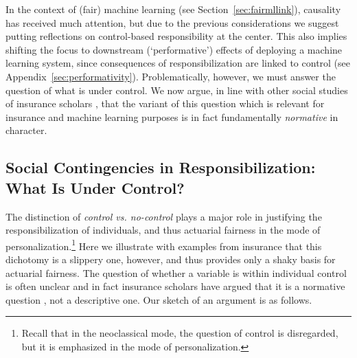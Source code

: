 \documentclass[11pt]{article} %
\begin{document}
In the context of (fair) machine learning (see Section~\ref{sec:fairmllink}), causality has received much attention, but due to the previous considerations we suggest putting reflections on control-based responsibility at the center. This also implies shifting the focus to downstream (`performative') effects of deploying a machine learning system, since consequences of responsibilization are linked to control (see Appendix~\ref{sec:performativity}). Problematically, however, we must answer the question of what is under control. We now argue, in line with other social studies of insurance scholars \citep{abraham1985efficiency,gaulding1994race}, that the variant of this question which is relevant for insurance and machine learning purposes is in fact fundamentally \textit{normative} in character.





\subsection{Social Contingencies in Responsibilization: What Is Under Control?}
\label{sec:contingencies}
The distinction of \textit{control vs. no-control} plays a major role in justifying the responsibilization of individuals, and thus actuarial fairness in the mode of personalization.\footnote{Recall that in the neoclassical mode, the question of control is disregarded, but it is emphasized in the mode of personalization.} Here we illustrate with examples from insurance that this dichotomy is a slippery one, however, and thus provides only a shaky basis for actuarial fairness. The question of whether a variable is within individual control is often unclear and in fact insurance scholars have argued that it is a normative question \citep{abraham1985efficiency,gaulding1994race}, not a descriptive one. Our sketch of an argument is as follows.
\end{document}
